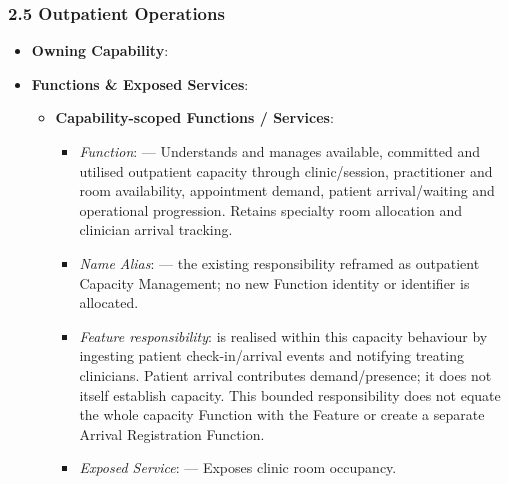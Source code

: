 \par\smallskip
{}\label{rad:hso:133}
\subsubsection*{2.5 Outpatient Operations}
\label{rad:hso:134}

\begin{itemize}

\item
\textbf{Owning Capability}: \texttt{}



\item
\textbf{Functions \& Exposed Services}:


\begin{itemize}

\item
\textbf{Capability-scoped Functions /\allowbreak{} Services}:


\begin{itemize}

\item
\emph{Function}: \texttt{} — Understands and manages available, committed and utilised outpatient capacity through clinic/\allowbreak{}session, practitioner and room availability, appointment demand, patient arrival/\allowbreak{}waiting and operational progression. Retains specialty room allocation and clinician arrival tracking.



\item
\emph{Name Alias}: \texttt{} — the existing responsibility reframed as outpatient Capacity Management; no new Function identity or identifier is allocated.



\item
\emph{Feature responsibility}: \texttt{} is realised within this capacity behaviour by ingesting patient check-in/\allowbreak{}arrival events and notifying treating clinicians. Patient arrival contributes demand/\allowbreak{}presence; it does not itself establish capacity. This bounded responsibility does not equate the whole capacity Function with the Feature or create a separate Arrival Registration Function.



\item
\emph{Exposed Service}: \texttt{} — Exposes clinic room occupancy.




\end{itemize}
\end{itemize}
\end{itemize}
